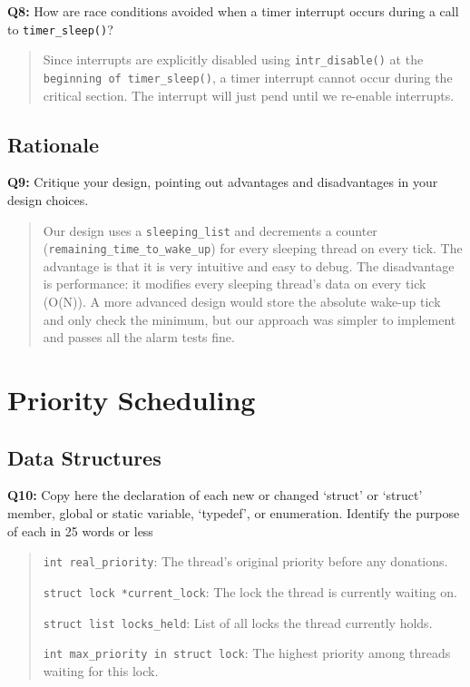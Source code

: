 \documentclass[a4paper,11pt]{paper}
\begin{document}
\textbf{Q8:} How are race conditions avoided when a timer interrupt occurs
during a call to \texttt{timer\_sleep()}?

\begin{quote}
  Since interrupts are explicitly disabled using \texttt{intr\_disable()} at the \texttt{beginning of timer\_sleep()}, a timer interrupt cannot occur during the critical section. The interrupt will just pend until we re-enable interrupts.
\end{quote}


\subsection{Rationale}

\textbf{Q9:} Critique your design, pointing out advantages and disadvantages in
your design choices.

\begin{quote}
  Our design uses a \texttt{sleeping\_list} and decrements a counter (\texttt{remaining\_time\_to\_wake\_up}) for every sleeping thread on every tick. The advantage is that it is very intuitive and easy to debug. The disadvantage is performance: it modifies every sleeping thread's data on every tick (O(N)). A more advanced design would store the absolute wake-up tick and only check the minimum, but our approach was simpler to implement and passes all the alarm tests fine.
\end{quote}




\section{Priority Scheduling}

\subsection{Data Structures}

\textbf{Q10:} Copy here the declaration of each new or changed `struct' or
`struct' member, global or static variable, `typedef', or enumeration.  Identify
the purpose of each in 25 words or less

\begin{quote}
  \texttt{int real\_priority}: The thread's original priority before any donations.

\texttt{struct lock *current\_lock}: The lock the thread is currently waiting on.

\texttt{struct list locks\_held}: List of all locks the thread currently holds.

\texttt{int max\_priority in struct lock}: The highest priority among threads waiting for this lock.
\end{quote}
\end{document}
